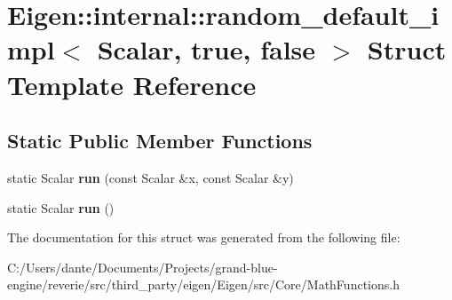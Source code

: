 \hypertarget{struct_eigen_1_1internal_1_1random__default__impl_3_01_scalar_00_01true_00_01false_01_4}{}\section{Eigen\+::internal\+::random\+\_\+default\+\_\+impl$<$ Scalar, true, false $>$ Struct Template Reference}
\label{struct_eigen_1_1internal_1_1random__default__impl_3_01_scalar_00_01true_00_01false_01_4}
\subsection*{Static Public Member Functions}
\begin{DoxyCompactItemize}
\item 
\mbox{\label{struct_eigen_1_1internal_1_1random__default__impl_3_01_scalar_00_01true_00_01false_01_4_a20b27fe8b2294c64487e14c0821ba289}} 
static Scalar {\bfseries run} (const Scalar \&x, const Scalar \&y)
\item 
\mbox{\label{struct_eigen_1_1internal_1_1random__default__impl_3_01_scalar_00_01true_00_01false_01_4_a09d0b990e00397e40fa4c8e764ea19d1}} 
static Scalar {\bfseries run} ()
\end{DoxyCompactItemize}


The documentation for this struct was generated from the following file\+:\begin{DoxyCompactItemize}
\item 
C\+:/\+Users/dante/\+Documents/\+Projects/grand-\/blue-\/engine/reverie/src/third\+\_\+party/eigen/\+Eigen/src/\+Core/Math\+Functions.\+h\end{DoxyCompactItemize}
